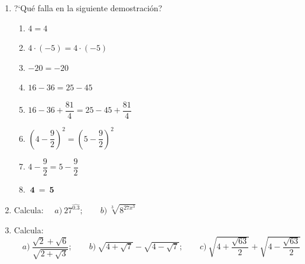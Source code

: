 \vspace{2mm}
\begin{enumerate}
\item	?`Qué falla en la siguiente demostración?

\begin{multicols}{2}
\begin{enumerate}
\item $4=4$
\item $4\cdot(-5)=4\cdot(-5)$
\item $-20=-20$
\item $16-36=25-45$
\item $16-36+\dfrac {81} 4=25-45+\dfrac {81} 4$
\item $\left(4-\dfrac 9 2 \right)^2=\left(5-\dfrac 9 2 \right)^2$
\item $4-\dfrac 9 2 = 5-\dfrac 9 2$
\item $\boxed{ \ \boldsymbol{4\ = \ 5} \ } $ 

\QED
\end{enumerate}
\end{multicols}
\vspace{-6mm}
\begin{flushright}
\begin{footnotesize} \textcolor{gris}{}	\end{footnotesize}
\end{flushright}

\item Calcula: $\quad a)\ 27^{\widehat{0.3}};\qquad b)\ \sqrt[3]{8^{27x^3}}$
\vspace{-6mm}
\begin{flushright}
\begin{footnotesize} \textcolor{gris}{}	\end{footnotesize}
\end{flushright}

\item Calcula: $\quad  a) \ \dfrac{\sqrt{2}+\sqrt{6}}{\sqrt{2+\sqrt{3}}} ;\qquad b)\  \sqrt{4+\sqrt{7}}-\sqrt{4-\sqrt{7}} ;\qquad c)\ \sqrt{4+\dfrac{\sqrt{63}}{2}}+\sqrt{4-\dfrac{\sqrt{63}}{2}}$ 

\vspace{-6mm}
\begin{flushright}
\begin{footnotesize} \textcolor{gris}{}	\end{footnotesize}
\end{flushright}


\end{enumerate}

